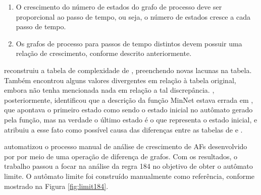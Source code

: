 \documentclass[12pt,a4paper]{article}
\begin{document}
\begin{enumerate}
\item O crescimento do número de estados do grafo de processo deve ser
proporcional ao passo de tempo, ou seja, o número de estados cresce
a cada passo de tempo.

\item Os grafos de processo para passos de tempo distintos devem possuir uma
relação de crescimento, conforme descrito anteriormente.
\end{enumerate}

 reconstruiu a tabela de complexidade de
, preenchendo novas lacunas na tabela. Também
encontrou alguns valores divergentes em relação à tabela original, embora
não tenha mencionada nada em relação a tal discrepância.
, posteriormente, identificou que a descrição da função
MinNet estava errada em , que apontava o primeiro
estado como sendo o estado inicial no autômato gerado pela função, mas na
verdade o último estado é o que representa o estado inicial, e atribuiu
a esse fato como possível causa das diferenças entre as tabelas de
 e .

 automatizou o processo manual de análise de crescimento
de AFs desenvolvido por  por meio de uma operação
de diferença de grafos. Com os resultados, o trabalho passou a focar na análise
da regra 184 no objetivo de obter o autômato limite. O autômato limite
foi construído manualmente como referência, conforme mostrado na Figura
\ref{fig:limit184}.
\end{document}
